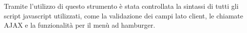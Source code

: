Tramite l’utilizzo di questo strumento è stata controllata la sintassi di tutti gli script javascript utilizzati, come la validazione dei campi
lato client, le chiamate AJAX e la funzionalità per il menù ad hamburger.